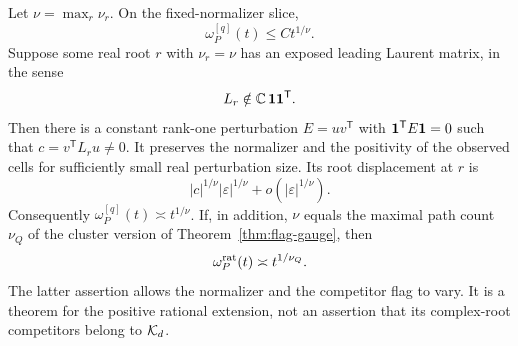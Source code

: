 \begin{theorem}
\label{thm:sharp-flag-modulus}
Let $\nu=\max_r\nu_r$. On the fixed-normalizer slice,
\[
                         \omega^{[q]}_P(t)\le C t^{1/\nu}.
\]
Suppose some real root $r$ with $\nu_r=\nu$ has an exposed leading
Laurent matrix, in the sense
\begin{equation}\label{eq:flag-exposure}
                        L_r\notin\mathbb C\,\mathbf 1\mathbf 1^{\mathsf T}.
\end{equation}
Then there is a constant rank-one perturbation $E=uv^{\mathsf T}$
with $\mathbf 1^{\mathsf T}E\mathbf 1=0$ such that $c=v^{\mathsf T}L_ru\ne0$.
It preserves the normalizer and the positivity of the observed cells
for sufficiently small real perturbation size. Its root displacement
at $r$ is
\begin{equation}\label{eq:flag-sharp-root}
           |c|^{1/\nu}|\varepsilon|^{1/\nu}
                                +o(|\varepsilon|^{1/\nu}).
\end{equation}
Consequently $\omega^{[q]}_P(t)\asymp t^{1/\nu}$.
If, in addition, $\nu$ equals the maximal path count $\nu_Q$ of the
cluster version of Theorem~\ref{thm:flag-gauge}, then
\begin{equation}\label{eq:full-flag-modulus}
              \omega^{\rm rat}_P(t)\asymp t^{1/\nu_Q}.
\end{equation}
The latter assertion allows the normalizer and the competitor flag
to vary. It is a theorem for the positive rational extension, not an
assertion that its complex-root competitors belong to $\mathcal K_d$.
\end{theorem}
